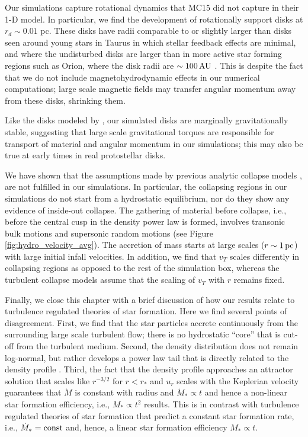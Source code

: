 \documentclass[../dissertation.tex]{subfiles}
\begin{document}
Our simulations capture rotational dynamics that MC15 did not capture in their 1-D model.  
In particular, we find the development of rotationally support disks at $r_d \sim 0.01$ pc.  
These disks have radii comparable to  or slightly larger than disks seen around 
young stars in Taurus \citep{1999AJ....117.1490P} in which stellar feedback effects are minimal,
and where the undisturbed disks are larger than in more active star forming regions such as Orion, 
where the disk radii are $\sim 100\,\rm AU$ \citep{2011ARA&A..49...67W}.  
This is despite the fact that we do not include magnetohydrodynamic effects 
in our numerical computations;  large scale magnetic fields may transfer angular 
momentum away from these disks, shrinking them.  

Like the disks modeled by \citet{2010ApJ...708.1585K},
our simulated disks are 
marginally gravitationally stable, suggesting that large scale gravitational torques are 
responsible for transport of material and angular momentum in our simulations; this may
also be true at early times in real protostellar disks.  

We have shown that the assumptions made by previous analytic collapse models
\citep{1977ApJ...214..488S,1992ApJ...396..631M,1997ApJ...476..750M,2003ApJ...585..850M}, 
are not fulfilled in our simulations.  In particular, 
the collapsing regions in our simulations do not start from a hydrostatic equilibrium, nor 
do they show any evidence of inside-out collapse.  The gathering of material before collapse, i.e.,
before the central cusp in the density power law is formed, involves transonic bulk motions 
and supersonic random motions (see Figure \ref{fig:hydro_velocity_avg}). The accretion of mass starts at large 
scales ($r\sim 1\,\rm pc$) with large initial infall velocities.  In addition, we find that $v_T$ 
scales differently in collapsing regions as opposed to the rest of the simulation box, 
whereas the turbulent collapse models \citep{1997ApJ...476..750M,2003ApJ...585..850M} assume 
that the scaling of $v_T$ with $r$ remains fixed.  

Finally, we close this chapter with a brief discussion of how our results relate to turbulence regulated theories of star formation. 
Here we find several points of disagreement. 
First, we find that the star 
particles accrete continuously from the surrounding large scale turbulent flow; there is 
no hydrostatic ``core'' that is cut-off from the turbulent medium. Second, 
the density distribution does not remain log-normal, but rather develops a power law tail that 
is directly related to the density profile \citep{2011ApJ...727L..20K,2015ApJ...800...49L}.  
Third, the fact that the density profile approaches an attractor solution that scales like 
$r^{-3/2}$ for $r<r_*$ and $u_r$ scales with the Keplerian velocity guarantees that $\dot{M}$ is 
constant with radius and $\dot{M}_*\propto t$ and hence a non-linear star formation efficiency, 
i.e., $M_* \propto t^2$ results. This is in contrast with turbulence regulated theories of star 
formation that predict a constant star formation rate, i.e., $\dot{M}_* = {\rm const}$ and, 
hence, a linear star formation efficiency $M_* \propto t$. 
\end{document}
